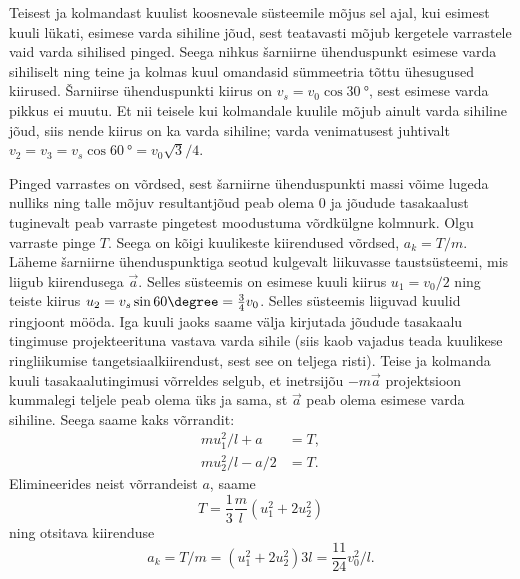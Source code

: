 {\ifSolution
Teisest ja kolmandast kuulist koosnevale süsteemile mõjus sel ajal, kui esimest kuuli lükati, esimese varda sihiline jõud, sest teatavasti mõjub kergetele varrastele vaid varda sihilised pinged. Seega nihkus šarniirne ühenduspunkt esimese varda sihiliselt ning teine ja kolmas kuul omandasid sümmeetria tõttu ühesugused kiirused. Šarniirse ühenduspunkti kiirus on $v_s = v_0 \cos \SI{30}{\degree}$, sest esimese varda pikkus ei muutu. Et nii teisele kui kolmandale kuulile mõjub ainult varda sihiline jõud, siis nende kiirus on ka varda sihiline; varda venimatusest juhtivalt $v_2 = v_3 = v_s \cos \SI{60}{\degree} = v_0 \sqrt 3/4$.

Pinged varrastes on võrdsed, sest šarniirne ühenduspunkti massi võime lugeda nulliks ning talle mõjuv resultantjõud peab olema 0 ja jõudude tasakaalust tuginevalt peab varraste pingetest moodustuma võrdkülgne kolmnurk. Olgu varraste pinge $T$. Seega on kõigi kuulikeste kiirendused võrdsed, $a_k = T /m$. Läheme šarniirne ühenduspunktiga seotud kulgevalt liikuvasse taustsüsteemi, mis liigub kiirendusega $\vec a$. Selles süsteemis on esimese kuuli kiirus $u_1 = v_0/2$ ning teiste kiirus $u_2 = v_s \sin 60\degree = \frac{3}{4} v_0$. Selles süsteemis liiguvad kuulid ringjoont mööda. Iga kuuli jaoks saame välja kirjutada jõudude tasakaalu tingimuse projekteerituna vastava varda sihile (siis kaob vajadus teada kuulikese ringliikumise tangetsiaalkiirendust, sest see on teljega risti). Teise ja kolmanda kuuli tasakaalutingimusi võrreldes selgub, et inetrsijõu $-m\vec a$ projektsioon kummalegi teljele peab olema üks ja sama, st $\vec a$ peab olema esimese varda sihiline. Seega saame kaks võrrandit:
\[
\begin{aligned}
mu_1^2/l + a &= T,\\
mu_2^2/l - a/2 &= T.
\end{aligned}
\]
Elimineerides neist võrrandeist $a$, saame
\[
T=\frac{1}{3} \frac{m}{l}\left(u_{1}^{2}+2 u_2^{2}\right)
\]
ning otsitava kiirenduse
\[
a_{k}=T / m=\left(u_{1}^{2}+2 u_2^{2}\right) 3 l=\frac{11}{24} v_{0}^{2} / l.
\]
\fi
}